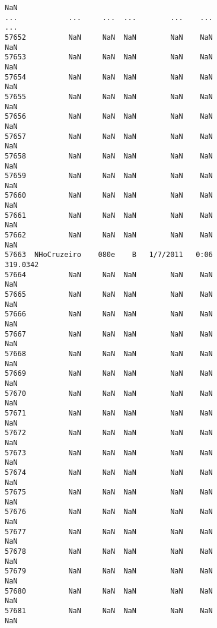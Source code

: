 \documentclass[a4paper,11pt,final]{article}
\begin{document}
\begin{Verbatim}[commandchars=\\\{\},frame=leftline,fontsize=\small, xleftmargin=0.5em]
NaN
...            ...     ...  ...        ...    ...
...
57652          NaN     NaN  NaN        NaN    NaN
NaN
57653          NaN     NaN  NaN        NaN    NaN
NaN
57654          NaN     NaN  NaN        NaN    NaN
NaN
57655          NaN     NaN  NaN        NaN    NaN
NaN
57656          NaN     NaN  NaN        NaN    NaN
NaN
57657          NaN     NaN  NaN        NaN    NaN
NaN
57658          NaN     NaN  NaN        NaN    NaN
NaN
57659          NaN     NaN  NaN        NaN    NaN
NaN
57660          NaN     NaN  NaN        NaN    NaN
NaN
57661          NaN     NaN  NaN        NaN    NaN
NaN
57662          NaN     NaN  NaN        NaN    NaN
NaN
57663  NHoCruzeiro    080e    B   1/7/2011   0:06
319.0342
57664          NaN     NaN  NaN        NaN    NaN
NaN
57665          NaN     NaN  NaN        NaN    NaN
NaN
57666          NaN     NaN  NaN        NaN    NaN
NaN
57667          NaN     NaN  NaN        NaN    NaN
NaN
57668          NaN     NaN  NaN        NaN    NaN
NaN
57669          NaN     NaN  NaN        NaN    NaN
NaN
57670          NaN     NaN  NaN        NaN    NaN
NaN
57671          NaN     NaN  NaN        NaN    NaN
NaN
57672          NaN     NaN  NaN        NaN    NaN
NaN
57673          NaN     NaN  NaN        NaN    NaN
NaN
57674          NaN     NaN  NaN        NaN    NaN
NaN
57675          NaN     NaN  NaN        NaN    NaN
NaN
57676          NaN     NaN  NaN        NaN    NaN
NaN
57677          NaN     NaN  NaN        NaN    NaN
NaN
57678          NaN     NaN  NaN        NaN    NaN
NaN
57679          NaN     NaN  NaN        NaN    NaN
NaN
57680          NaN     NaN  NaN        NaN    NaN
NaN
57681          NaN     NaN  NaN        NaN    NaN
NaN


\end{Verbatim}
\end{document}
